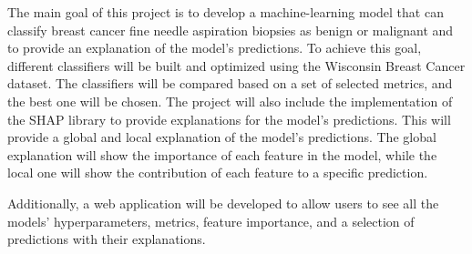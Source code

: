 The main goal of this project is to develop a machine-learning model that can classify breast cancer fine needle aspiration biopsies as benign or malignant and to provide an explanation of the model's predictions. To achieve this goal, different classifiers will be built and optimized using the Wisconsin Breast Cancer dataset. The classifiers will be compared based on a set of selected metrics, and the best one will be chosen. The project will also include the implementation of the SHAP library to provide explanations for the model's predictions. This will provide a global and local explanation of the model's predictions. The global explanation will show the importance of each feature in the model, while the local one will show the contribution of each feature to a specific prediction.

Additionally, a web application will be developed to allow users to see all the models' hyperparameters, metrics, feature importance, and a selection of predictions with their explanations.